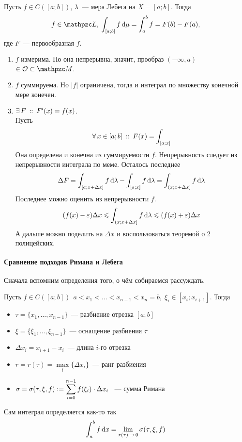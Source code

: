 \documentclass[draft, timbord]{longnotes}
\begin{document}
\begin{thrm}\label{thrm:meas::contint}
  Пусть $f \in C([a;b])$, $\lambda$~--- мера Лебега на $X = [a;b]$. Тогда
  \[
    f \in \summb , \; \int_{[a;b]} f \, \del \mu = \int_a ^b f = F(b) - F(a),
  \]
  где $F$~--- первообразная $f$.
\end{thrm}
\begin{tproof}
  \begin{enumerate}[1)]
    \item \gprov $f$ измерима. Но она непрерывна, значит, прообраз $(-\infty, a)$
      $\in \open \subset \lebesgue$.
    \item \gprov $f$ суммируема.  Но $|f|$ ограничена, тогда и интеграл по множеству конечной
      мере конечен.
    \item $\exists\,F \:::\:  F'(x) = f(x)$. \\
      Пусть
      \[
        \forall\, x \in [a;b] \:::\: F(x) = \int_{[a;x]} 
      \]
      Она определена и конечна из суммируемости $f$.
      Непрерывность следует из непрерывности интеграла по меме. Осталось последнее
      \[
        \Delta F =  \int_{[a;x+\Delta x]} f\, \mathrm{d} \lambda - \int_{[a;x]} f\, \mathrm{d} \lambda 
        = \int_{(x;x+\Delta x]} f\, \mathrm{d} \lambda 
      \]
      Последнее можно оценить из непрерывности $f$.
      \[
        (f(x) - \varepsilon )\Delta x 
        \leqslant \int_{(x;x+\Delta x]} f\, \mathrm{d} \lambda  \leqslant 
        (f(x) + \varepsilon )\Delta x 
      \]
      А дальше можно поделить на $\Delta x$ и воспользоваться теоремой о 2 полицейских.
  \end{enumerate}
\end{tproof}

\paragraph{Сравнение подходов Римана и Лебега}
\label{par:meas::rimleb}

Сначала вспомним определения того, о чём собираемся рассуждать.

\begin{defn}\label{defn:meas::rimleb::rim}
  Пусть $f\in C([a;b])\,\; a < x_1 < \dots < x_{n-1} < x_n = b,\; 
  \xi_i\in[x_i;x_{i+1}]$. Тогда 
    \begin{itemize}
      \item $\tau = \{x_1,\dots,x_{n-1}\}$~--- разбиение отрезка $[a;b]$
      \item $\xi = \{\xi_1,\dots,\xi_{n-1}\}$~--- оснащение разбиения $\tau$
      \item $\Delta x_i = x_{i+1}-x_i$~--- длина $i$-го отрезка
      \item $r=r(\tau) = \max\limits_i\{\Delta x_i\}$~--- ранг разбиения
      \item $\sigma = \sigma(\tau,\xi,f):= \displaystyle\sum\limits_{i=0}^{n-1}f(\xi_i)\cdot\Delta x_i$ ~---
        сумма Римана
    \end{itemize}
    Сам интеграл определяется как-то так 
    \[
      \int_a^b f \, \del x = \lim_{r(\tau)\to 0} \sigma(\tau,\xi,f)
    \]
\end{defn}
\end{document}
